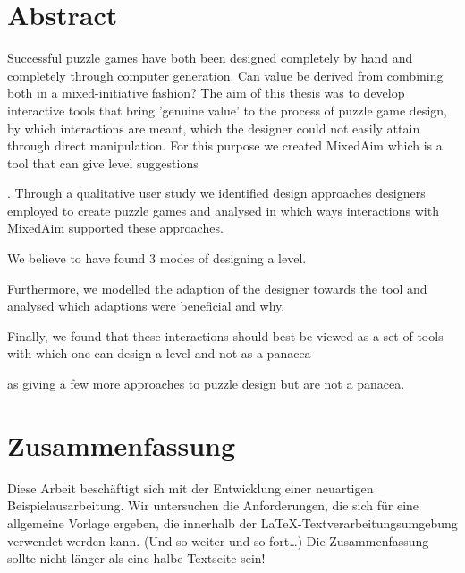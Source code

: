 
\chapter*{Abstract}

Successful puzzle games have both been designed completely by hand and completely through computer generation. Can value be derived from combining both in a mixed-initiative fashion?
The aim of this thesis was to develop interactive tools that bring 'genuine value' to the process of puzzle game design, by which interactions are meant, which the designer could not easily attain through direct manipulation.
For this purpose we created MixedAim which is a tool that can give level suggestions   

. Through a qualitative user study we identified design approaches  designers employed to create puzzle games and analysed in which ways interactions with MixedAim supported these approaches.

We believe to have found 3 modes of designing a level.

Furthermore, we modelled the adaption of the designer towards the tool and analysed which adaptions were beneficial and why.

Finally, we found that these interactions should best be viewed as a set of tools with which one can design a level and not as a panacea   

 as giving a few more approaches to puzzle design but are not a panacea.







\cleardoublepage
\chapter*{Zusammenfassung}

Diese Arbeit beschäftigt sich mit der Entwicklung einer neuartigen Beispielausarbeitung. Wir untersuchen die Anforderungen, die sich für eine allgemeine Vorlage ergeben, die innerhalb der \LaTeX-Textverarbeitungsumgebung verwendet werden kann. (Und so weiter und so fort\dots) Die Zusammenfassung sollte nicht länger als eine halbe Textseite sein!
